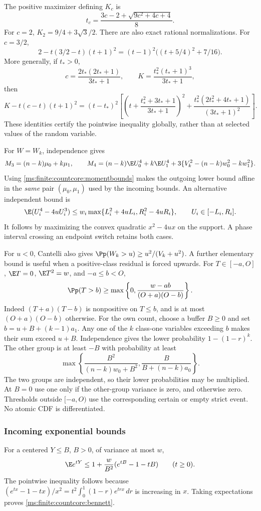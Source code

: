 The positive maximizer defining \(K_c\) is
\[
 t_c=\frac{3c-2+\sqrt{9c^2+4c+4}}8.
\]
For \(c=2\), \(K_2=9/4+3\sqrt3/2\). There are also exact rational
normalizations. For \(c=3/2\),
\[
 2-t(3/2-t)(t+1)^2
 =(t-1)^2\bigl((t+5/4)^2+7/16\bigr).
\]
More generally, if \(t_*>0\),
\[
 c=\frac{2t_*(2t_*+1)}{3t_*+1},\qquad
 K=\frac{t_*^2(t_*+1)^3}{3t_*+1},
\]
then
\[
 K-t(c-t)(t+1)^2=(t-t_*)^2
 \left[\left(t+\frac{t_*^2+3t_*+1}{3t_*+1}\right)^2
       +\frac{t_*^2(2t_*^2+4t_*+1)}{(3t_*+1)^2}\right].
\]
These identities certify the pointwise inequality globally, rather than at
selected values of the random variable.

For \(W=W_k\), independence gives
\[
 M_3=(n-k)\mu_0+k\mu_1,\qquad
 M_4=(n-k)\E U_0^4+k\E U_1^4
       +3\{V_k^2-(n-k)w_0^2-kw_1^2\}.
\]
Using \eqref{ms:finite:countcore:momentbounds} makes the outgoing lower bound
affine in the \emph{same} pair \((\mu_0,\mu_1)\) used by the
incoming bounds. An alternative independent bound is
\[
 \E(U_i^4-4uU_i^3)
 \le w_i\max\{L_i^2+4uL_i,R_i^2-4uR_i\},
 \qquad U_i\in[-L_i,R_i].
\]
It follows by maximizing the convex quadratic \(x^2-4ux\) on the
support. A phase interval crossing an endpoint switch retains both cases.

For \(u<0\), Cantelli also gives
\(\Pp(W_k>u)\ge u^2/(V_k+u^2)\). A further elementary bound is
useful when a positive-class residual is forced upwards. For
\(T\in[-a,O]\), \(\E T=0\), \(\E T^2=w\), and \(-a\le b<O\),
\[
 \Pp(T>b)\ge\max\left\{0,
             \frac{w-ab}{(O+a)(O-b)}\right\}.
\]
Indeed \((T+a)(T-b)\) is nonpositive on \(T\le b\), and is at
most \((O+a)(O-b)\) otherwise. For the own count, choose a buffer
\(B\ge0\) and set \(b=u+B+(k-1)a_1\). Any one of the \(k\)
class-one variables exceeding \(b\) makes their sum exceed \(u+B\).
Independence gives the lower probability \(1-(1-r)^k\). The other
group is at least \(-B\) with probability at least
\[
 \max\left\{\frac{B^2}{(n-k)w_0+B^2},
             \frac{B}{B+(n-k)a_0}\right\}.
\]
The two groups are independent, so their lower probabilities may be
multiplied. At \(B=0\) use one only if the other-group variance is
zero, and otherwise zero. Thresholds outside \([-a,O)\) use the
corresponding certain or empty strict event. No atomic CDF is differentiated.

\subsubsection{Incoming exponential bounds}

For a centered \(Y\le B\), \(B>0\), of variance at most \(w\),
\begin{equation}
 \E e^{tY}\le1+\frac w{B^2}(e^{tB}-1-tB)
 \qquad(t\ge0).
 \label{ms:finite:countcore:bennett}
\end{equation}
The pointwise inequality follows because
\((e^{tx}-1-tx)/x^2=t^2\int_0^1(1-r)e^{trx}\,dr\) is increasing
in \(x\). Taking expectations proves \eqref{ms:finite:countcore:bennett}.

